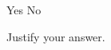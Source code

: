 \documentclass{../../oss-apphys-exam}
\begin{document}
\begin{multicols*}{2}
\begin{questions}
\begin{parts}
    \vspace{.2in}
    \underline{\hspace{.5in}} Yes\hspace{.5in}
    \underline{\hspace{.5in}} No

    \vspace{.2in}Justify your answer.
    \vspace{\stretch1}
  \end{parts}
  \newpage

%
%

\end{questions}
\end{multicols*}
\end{document}
